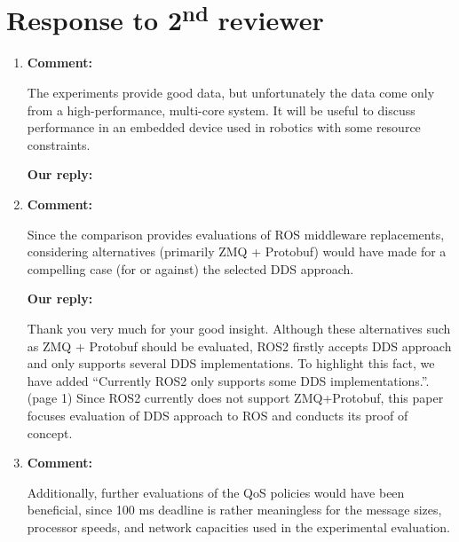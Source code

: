 \documentclass{article}
\newcommand\nd{\textsuperscript{nd}\xspace}
\begin{document}
\begin{itemize}
\end{itemize}

\newpage

\section{Response to 2\nd reviewer}
\begin{enumerate}

\item \begin{flushleft}
    \textbf{Comment:}
  \end{flushleft}
  The experiments provide good data, but unfortunately the data come only from a high-performance, multi-core system. 
  It will be useful to discuss performance in an embedded device used in robotics with some resource constraints.

  \begin{flushleft}
    \textbf{Our reply:}
  \end{flushleft}

\item \begin{flushleft}
    \textbf{Comment:}
  \end{flushleft}
  Since the comparison provides evaluations of ROS middleware replacements, considering alternatives (primarily ZMQ + Protobuf) would have made for a compelling case (for or against) the selected DDS approach.

  \begin{flushleft}
    \textbf{Our reply:}
  \end{flushleft}
  Thank you very much for your good insight. 
  Although these alternatives such as ZMQ + Protobuf should be evaluated, ROS2 firstly accepts DDS approach and only supports several DDS implementations. 
  To highlight this fact, we have added ``Currently ROS2 only supports some DDS implementations.''. (page 1) 
  Since ROS2 currently does not support ZMQ+Protobuf, this paper focuses evaluation of DDS approach to ROS and conducts its proof of concept.

\item \begin{flushleft}
    \textbf{Comment:}
  \end{flushleft}
  Additionally, further evaluations of the QoS policies would have been beneficial, since 100 ms deadline is rather meaningless for the message sizes, processor speeds, and network capacities used in the experimental evaluation.


\end{enumerate}
\end{document}
